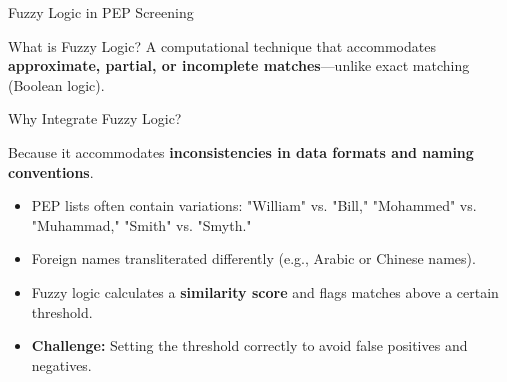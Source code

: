 \documentclass{beamer}
\begin{document}
	\begin{frame}{Fuzzy Logic in PEP Screening}
		\begin{block}{What is Fuzzy Logic?}
			A computational technique that accommodates \textbf{approximate, partial, or incomplete matches}—unlike exact matching (Boolean logic).
		\end{block}
		\begin{block}{Why Integrate Fuzzy Logic?}
			\begin{center}
				Because it accommodates \textbf{inconsistencies in data formats and naming conventions}.
			\end{center}
		\end{block}
		\begin{itemize}
			\item PEP lists often contain variations: "William" vs. "Bill," "Mohammed" vs. "Muhammad," "Smith" vs. "Smyth."
			\item Foreign names transliterated differently (e.g., Arabic or Chinese names).
			\item Fuzzy logic calculates a \textbf{similarity score} and flags matches above a certain threshold.
			\item \textbf{Challenge:} Setting the threshold correctly to avoid false positives and negatives.
		\end{itemize}
	\end{frame}
	
\end{document}
